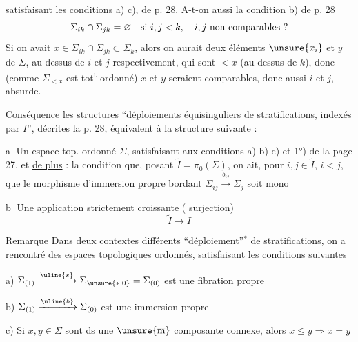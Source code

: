 satisfaisant les conditions a) c),  de p. 28.
A-t-on aussi la condition b) de p. 28
\[
\Sigma_{ik}\cap\Sigma_{jk}=\varnothing\quad\hbox{si }i,j<k,\quad
i,j\ \hbox{non comparables ?}
\]
Si on avait $x\in\Sigma_{ik}\cap\Sigma_{jk}\subset\Sigma_k$,
alors on aurait deux éléments $\unsure{x_i}$ et $y$ de $\Sigma$,
au dessus de $i$ et $j$ respectivement, qui sont $<x$
(au dessus de $k$), donc (comme $\Sigma_{<x}$ est tot\textsuperscript{t} ordonné)
 $x$ et $y$ seraient comparables, donc aussi
$i$ et $j$, absurde.

\uline{Conséquence} les structures ``déploiements
équisinguliers de stratifications, indexés par $I$'',
décrites  la p. 28, équivalent à la structure suivante :


\textcircled{a} Un \deleted{$\Sigma$} espace top. ordonné $\Sigma$,
satisfaisant aux conditions a) b) c) et 1°) de la page 27,
et \uline{de plus} : la condition que, 
posant $\widetilde I=\pi_0(\Sigma)$, on ait, pour
$i,j\in\widetilde I$, $i<j$, que le morphisme d'immersion
propre bordant $\Sigma_{ij}\xrightarrow{b_{ij}}\Sigma_j$ soit
\uline{mono}

\textcircled{b} Une application strictement croissante
( surjection)
\[
\widetilde I\longrightarrow I
\]

\uline{Remarque} Dans deux contextes différents
``déploiement''$^{*}$ de  stratifications, on
a rencontré des espaces topologiques ordonnés\inserted{$\Sigma$},
satisfaisant les conditions suivantes


a) $\Sigma_{(1)}\xrightarrow{\uline{s}}\Sigma_{\unsure{*|0}}=\Sigma_{(0)}$
est une fibration propre

b) $\Sigma_{(1)}\xrightarrow{\uline{b}}\Sigma_{(0)}$ est une immersion propre

c) Si $x,y\in\Sigma$ sont ds une $\unsure{\overline{\mathrm m}}$ composante connexe,
alors $x\leq y\Longrightarrow x=y$


